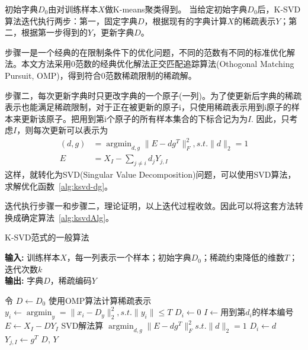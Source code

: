     初始字典$D_0$由对训练样本$X$做K-means\cite{}聚类得到。
    当给定初始字典$D_0$后，K-SVD算法迭代执行两步：第一，固定字典$D$，根据现有的字典计算$X$的稀疏表示$Y$；第二，根据第一步得到的$Y$，更新字典$D$。

    步骤一是一个经典的在限制条件下的优化问题，不同的范数有不同的标准优化解法。本文方法采用0范数的经典优化解法正交匹配追踪算法(Othogonal Matching Pursuit, OMP)\cite{pati1993orthogonal}，得到符合0范数稀疏限制的稀疏解。

    步骤二，每次更新字典时只更改字典的一个原子(一列)。为了使更新后字典的稀疏表示也能满足稀疏限制，对于正在被更新的原子i，只使用稀疏表示用到i原子的样本来更新该原子。把用到第i个原子的所有样本集合的下标合记为为$I$. 因此，只考虑$I$，则每次更新可以表示为
    \begin{equation}
    \label{alg:ksvd-dg}
    \begin{split}
    (d, g) &= \mathop{\arg \min}_{d, g}\|E - d g^T\| ^2 _F, s.t.\|d\|_ 2 = 1 \\
    E &= X_I - \sum _{j\ne i} d_j Y_{j, I}
    \end{split}
    \end{equation}
    这样，就转化为SVD(Singular Value Decomposition)问题，可以使用SVD算法，求解优化函数~\ref{alg:ksvd-dg}。

    迭代执行步骤一和步骤二，理论证明\cite{aharon2006rm}，以上迭代过程收敛。因此可以将这套方法转换成确定算法~\ref{alg:ksvdAlg}。

    \begin{algorithm}[b]
    \caption{K-SVD范式的一般算法} %
    \hspace*{0.02in} {\bf 输入:} %
    训练样本$X $，每一列表示一个样本；初始字典$D_0$；稀疏约束降低的维数$T$；迭代次数$k$ \\
    \hspace*{0.02in} {\bf 输出:} %
    字典$D$，稀疏编码$Y$
    \begin{algorithmic}[1]
    \State 令 $D \leftarrow D_0$
            \State 使用OMP算法计算稀疏表示 $y_i \leftarrow \mathop{\arg\min}_{y} = \|x_i - D_y\| ^2_2, s.t. \|y_i\| \le T $  \label{alg:line:omp}
        \EndFor
            \State $D_i \leftarrow 0$
            \State $I \leftarrow 用到第d_i的样本编号$
            \State $E \leftarrow X_I - D Y_I$
            \State SVD解法算 $\mathop{\arg\min}_{d, g}\|E - dg^T\|^2 _F s.t. \|d\|_2 = 1 $\label{alg:line:appro}
            \State $D_i \leftarrow d$
            \State $Y_{j, I} \leftarrow g^T$
        \EndFor
    \EndFor
    \State \Return $D$, $Y$
    \end{algorithmic}
    \label{alg:ksvdAlg}
    \end {algorithm}

